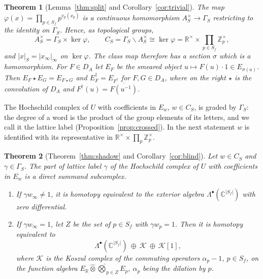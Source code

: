 \documentclass[11pt]{amsart}
\newtheorem{theorem}{Theorem}[section]
\theoremstyle{definition}
\theoremstyle{remark}
\newcommand{\C}{\mathbb C}
\newcommand{\R}{\mathbb R}
\newcommand{\Z}{\mathbb Z}
\begin{document}
\begin{theorem}[Lemma~\ref{thm:split} and
Corollary~\ref{cor:trivial}]\label{thm:introA}
The map $\varphi(x)=\prod_{p\in S_f}p^{v_p(x_p)}$ is a continuous
homomorphism $A_S^{\times}\to\Gamma_S$ restricting to the identity on
$\Gamma_S$.  Hence, as topological groups,
\[
A_S^{\times}=\Gamma_S\times\ker\varphi,\qquad
C_S=\Gamma_S\backslash A_S^{\times}\cong\ker\varphi=
\R^{\times}\times\prod_{p\in S_f}\Z_p^{\times},
\]
and $|x|_S=|x_{\infty}|_{\infty}$ on $\ker\varphi$.  The class map therefore
has a section $\sigma$ which is a homomorphism.  For $F\in D_A$ let $E_F$ be
the smeared object $u\mapsto F(u)\cdot1\in E_{\sigma(u)}$.  Then
$E_F\star E_G=E_{F\star G}$ and $E_F^{\dagger}=E_{F^{\dagger}}$ for
$F,G\in D_A$, where on the right $\star$ is the convolution of $D_A$ and
$F^{\dagger}(u)=\overline{F(u^{-1})}$.
\end{theorem}

The Hochschild complex of $U$ with coefficients in $E_w$, $w\in C_S$, is
graded by $\Gamma_S$: the degree of a word is the product of the group
elements of its letters, and we call it the lattice label
(Proposition~\ref{prop:crossed}).  In the next statement $w$ is identified
with its representative in $\R^{\times}\times\prod_p\Z_p^{\times}$.

\begin{theorem}[Theorem~\ref{thm:shadow} and
Corollary~\ref{cor:blind}]\label{thm:introH}
Let $w\in C_S$ and $\gamma\in\Gamma_S$.  The part of lattice label $\gamma$ of
the Hochschild complex of $U$ with coefficients in $E_w$ is a direct summand
subcomplex.
\begin{enumerate}
\item[(i)] If $\gamma w_{\infty}\ne1$, it is homotopy equivalent to the
exterior algebra $\Lambda^{\bullet}(\C^{|S_f|})$ with zero differential.
\item[(ii)] If $\gamma w_{\infty}=1$, let $Z$ be the set of $p\in S_f$ with
$\gamma w_p=1$.  Then it is homotopy equivalent to
\[
\Lambda^{\bullet}(\C^{|S_f|})\ \oplus\ \mathcal K\ \oplus\ \mathcal K[1],
\]
where $\mathcal K$ is the Koszul complex of the commuting operators
$\alpha_p-1$, $p\in S_f$, on the function algebra
$E_{\R}\widehat\otimes\widehat\bigotimes_{p\in Z}E_p$, $\alpha_p$ being the dilation
by $p$.
\end{enumerate}
\end{theorem}
\end{document}
